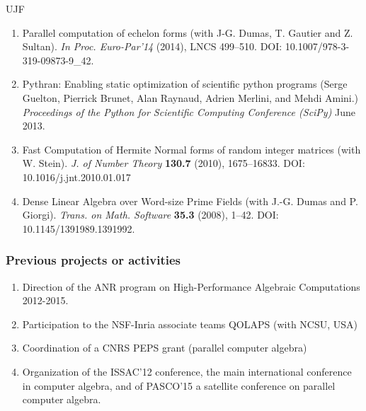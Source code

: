 \begin{sitedescription}{UJF}
\begin{description}
\begin{enumerate}[1.]
\item Parallel computation of echelon forms (with J-G. Dumas, T. Gautier and Z. Sultan). 
\emph{In Proc. Euro-Par'14}  (2014),  LNCS 499--510. DOI: 10.1007/978-3-319-09873-9\_42.

\item Pythran: Enabling static optimization of scientific python programs
  (Serge Guelton, Pierrick Brunet, Alan Raynaud, Adrien Merlini, and Mehdi Amini.)
\emph{Proceedings of the Python for Scientific Computing Conference (SciPy)} June 2013.

\item Fast Computation of Hermite Normal forms of random integer matrices (with
W. Stein).
\emph{J. of Number Theory} {\bf{130.7}} (2010), 1675--16833. DOI: 10.1016/j.jnt.2010.01.017

\item Dense Linear Algebra over Word-size Prime Fields (with J.-G. Dumas and P. Giorgi). 
\emph{Trans. on Math. Software} {\bf{35.3}} (2008), 1--42. DOI: 10.1145/1391989.1391992.
\end{enumerate}

\end{description}

\subsubsection*{Previous projects or activities}

\begin{enumerate}
\item Direction of the ANR program on High-Performance Algebraic
  Computations 2012-2015.
\item Participation to the NSF-Inria associate teams QOLAPS (with NCSU, USA)
\item Coordination of a CNRS PEPS grant (parallel computer algebra)
\item Organization of the ISSAC'12 conference, the main
  international conference in computer algebra, and of PASCO'15 a satellite
  conference on parallel computer algebra.
\end{enumerate}


\end{sitedescription}



